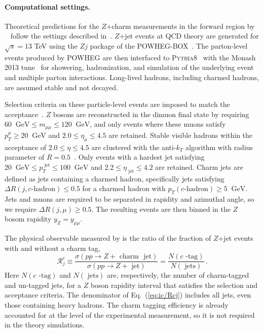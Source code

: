 \paragraph{Computational settings.}
%
Theoretical predictions for
the $Z$+charm measurements in the forward region 
by \lhcb~\cite{LHCb:2021stx} follow the 
 settings described in~\cite{Boettcher:2015sqn}.
%
$Z$+jet events at \nlo QCD theory are generated for $\sqrt{s}= 13$ TeV  using the $Zj$ package of the
\textsc{\small POWHEG-BOX}~\cite{Alioli:2010xd}.
%
The parton-level events produced by \textsc{\small POWHEG}
are then interfaced to \textsc{\small Pythia8}~\cite{Sjostrand:2007gs}
with the Monash 2013 tune~\cite{Skands:2014pea} for showering,
hadronization, and simulation of the underlying event and multiple
parton interactions.
%
Long-lived hadrons, including charmed hadrons,
are assumed stable and not decayed.

Selection criteria on these particle-level events are imposed
to match the \lhcb acceptance~\cite{LHCb:2021stx}.
%
$Z$ bosons are reconstructed in the dimuon final state by
requiring $60~\textrm{ GeV}\le m_{\mu\mu} \le 120~\textrm{ GeV}$,
and
only events where these muons satisfy
    $p_T^\mu \ge 20~\textrm{ GeV}$ and $2.0 \le \eta_{\mu}\le 4.5$
    are retained.
%
Stable visible hadrons within the \lhcb acceptance of
$2.0 \le \eta \le 4.5$ are clustered with
the anti-$k_T$ algorithm with radius parameter
of $R=0.5$~\cite{Cacciari:2008gp}.
%
Only events with a hardest jet satisfying
  $ 20~\textrm{ GeV} \le p_T^\textrm{ jet} \le 100~\textrm{ GeV}$
and $2.2 \le \eta_\textrm{ jet}\le 4.2$ are retained.
%
Charm jets are defined as jets containing
a charmed hadron, specifically  jets satisfying
$\Delta R(j, c\textrm{-hadron})\le 0.5$ for a charmed
hadron with $p_T(c\textrm{-hadron})\ge 5~\textrm{ GeV}$.
%
Jets and muons are required to be separated
in rapidity and azimuthal angle, so
we require $\Delta R(j, \mu)\ge 0.5$.
%
The resulting events
are then binned in the $Z$ bosom rapidity $y_Z = y_{\mu \mu}$.

The physical observable measured by \lhcb is the ratio of the fraction of $Z$+jet
    events with and without a charm tag,
    \begin{equation}
    \label{eq:ic/Rcj}
        \mathcal{R}_j^c \equiv \frac{\sigma(pp\to Z+\textrm{ charm~ jet})}{\sigma(pp \to Z+\textrm{ jet})}=
         \frac{N(c\textrm{ -tag})}{ 
        N(\textrm{ jets})} \, .
    \end{equation}
 Here  $N(c\textrm{ -tag})$ and $N(\textrm{ jets})$ are, respectively, the number
    of charm-tagged and un-tagged jets, for a  $Z$ boson rapidity interval
    that satisfies the selection and acceptance criteria.
    The denominator of Eq.~(\ref{eq:ic/Rcj}) includes all jets, even those
    containing heavy hadrons.
The charm tagging efficiency is already accounted for at the level
of the experimental measurement, so it is not required in the theory
simulations.

